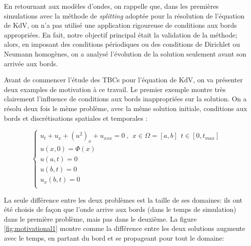 \indent En retournant aux modèles d'ondes, on rappelle que, dans les premières simulations avec la méthode de \emph{splitting} adoptée pour la résolution de l'équation de KdV, on n'a pas utilisé une application rigoureuse  de conditions aux bords appropriées. En fait, notre objectif principal était la validation de la méthode; alors, en imposant des conditions périodiques ou des conditions de Dirichlet ou Neumann homogènes, on a analysé l'évolution de la solution seulement avant son arrivée aux bords.

\indent Avant de commencer l'étude des TBCs pour l'équation de KdV, on va présenter deux examples de motivation à ce travail. Le premier exemple montre très clairement l'influence de conditions aux bords inappropriées sur la solution. On a résolu deux fois le mème problème, avec la même solution initiale, conditions aux bords et discrétisations spatiales et temporales :

\begin{equation*}
    \begin{cases}
    u_t + u_x + (u^2)_x + u_{xxx} = 0 \ , \ \ x \in \Omega=[a,b] \ \ t \in [0, t_{max}] \\
    u(x,0) = \Phi(x) \\
    u(a,t) = 0 \\
    u(b,t) = 0 \\
    u_x(b,t) = 0  \\ 
    \end{cases}
\end{equation*}

\indent La seule différence entre les deux problèmes est la taille de ses domaines: ils ont été choisis de façon que l'onde arrive aux bords (dans le temps de simulation) dans le première problème, mais pas dans le deuxième. La figure \ref{fig:motivational1} montre comme la différence entre les deux solutions augmente avec le temps, en partant du bord et se propageant pour tout le domaine:

